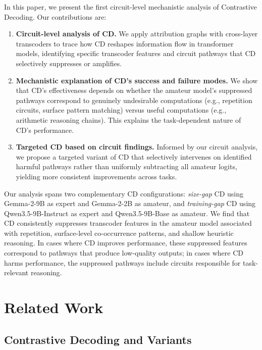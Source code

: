 \documentclass[11pt]{article}
\begin{document}
In this paper, we present the first circuit-level mechanistic analysis of Contrastive Decoding. Our contributions are:

\begin{enumerate}
    \item \textbf{Circuit-level analysis of CD.} We apply attribution graphs with cross-layer transcoders to trace how CD reshapes information flow in transformer models, identifying specific transcoder features and circuit pathways that CD selectively suppresses or amplifies.

    \item \textbf{Mechanistic explanation of CD's success and failure modes.} We show that CD's effectiveness depends on whether the amateur model's suppressed pathways correspond to genuinely undesirable computations (e.g., repetition circuits, surface pattern matching) versus useful computations (e.g., arithmetic reasoning chains). This explains the task-dependent nature of CD's performance.

    \item \textbf{Targeted CD based on circuit findings.} Informed by our circuit analysis, we propose a targeted variant of CD that selectively intervenes on identified harmful pathways rather than uniformly subtracting all amateur logits, yielding more consistent improvements across tasks.
\end{enumerate}

Our analysis spans two complementary CD configurations: \emph{size-gap} CD using Gemma-2-9B as expert and Gemma-2-2B as amateur, and \emph{training-gap} CD using Qwen3.5-9B-Instruct as expert and Qwen3.5-9B-Base as amateur. We find that CD consistently suppresses transcoder features in the amateur model associated with repetition, surface-level co-occurrence patterns, and shallow heuristic reasoning. In cases where CD improves performance, these suppressed features correspond to pathways that produce low-quality outputs; in cases where CD harms performance, the suppressed pathways include circuits responsible for task-relevant reasoning.

\section{Related Work}
\label{sec:related}

\subsection{Contrastive Decoding and Variants}
\end{document}

